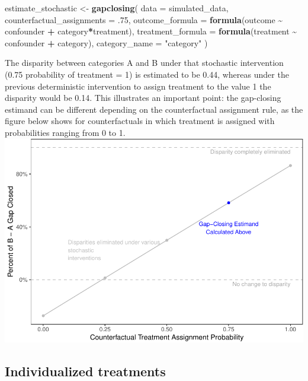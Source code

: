 \documentclass[
]{article}
\newenvironment{Shaded}{\begin{snugshade}}{\end{snugshade}}
\newcommand{\AttributeTok}[1]{\textcolor[rgb]{0.13,0.29,0.53}{#1}}
\newcommand{\DecValTok}[1]{\textcolor[rgb]{0.00,0.00,0.81}{#1}}
\newcommand{\FunctionTok}[1]{\textcolor[rgb]{0.13,0.29,0.53}{\textbf{#1}}}
\newcommand{\NormalTok}[1]{#1}
\newcommand{\OtherTok}[1]{\textcolor[rgb]{0.56,0.35,0.01}{#1}}
\newcommand{\SpecialCharTok}[1]{\textcolor[rgb]{0.81,0.36,0.00}{\textbf{#1}}}
\newcommand{\StringTok}[1]{\textcolor[rgb]{0.31,0.60,0.02}{#1}}
\begin{document}
\begin{Shaded}
\begin{Highlighting}[]
\NormalTok{estimate\_stochastic }\OtherTok{\textless{}{-}} \FunctionTok{gapclosing}\NormalTok{(}
  \AttributeTok{data =}\NormalTok{ simulated\_data,}
  \AttributeTok{counterfactual\_assignments =}\NormalTok{ .}\DecValTok{75}\NormalTok{,}
  \AttributeTok{outcome\_formula =} \FunctionTok{formula}\NormalTok{(outcome }\SpecialCharTok{\textasciitilde{}}\NormalTok{ confounder }\SpecialCharTok{+}\NormalTok{ category}\SpecialCharTok{*}\NormalTok{treatment),}
  \AttributeTok{treatment\_formula =} \FunctionTok{formula}\NormalTok{(treatment }\SpecialCharTok{\textasciitilde{}}\NormalTok{ confounder }\SpecialCharTok{+}\NormalTok{ category),}
  \AttributeTok{category\_name =} \StringTok{"category"}
\NormalTok{)}
\end{Highlighting}
\end{Shaded}

The disparity between categories A and B under that stochastic intervention (0.75 probability of treatment = 1) is estimated to be 0.44, whereas under the previous deterministic intervention to assign treatment to the value 1 the disparity would be 0.14. This illustrates an important point: the gap-closing estimand can be different depending on the counterfactual assignment rule, as the figure below shows for counterfactuals in which treatment is assigned with probabilities ranging from 0 to 1.
\includegraphics{github_doc_files/figure-latex/unnamed-chunk-26-1.pdf}

\subsection{Individualized treatments}\label{individualized-treatments}
\end{document}
